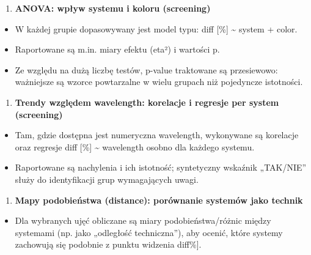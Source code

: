 \documentclass[
  10pt,
]{article}
\providecommand{\tightlist}{%
  \setlength{\itemsep}{0pt}\setlength{\parskip}{0pt}}
\begin{document}
\begin{enumerate}
\def\labelenumi{\arabic{enumi}.}
\setcounter{enumi}{4}
\tightlist
\item
  \textbf{ANOVA: wpływ systemu i koloru (screening)}
\end{enumerate}

\begin{itemize}
\tightlist
\item
  W każdej grupie dopasowywany jest model typu: \textbar diff\textbar{}
  {[}\%{]} \textasciitilde{} system + color.
\item
  Raportowane są m.in. miary efektu (eta²) i wartości p.
\item
  Ze względu na dużą liczbę testów, p-value traktowane są przesiewowo:
  ważniejsze są wzorce powtarzalne w wielu grupach niż pojedyncze
  istotności.
\end{itemize}

\begin{enumerate}
\def\labelenumi{\arabic{enumi}.}
\setcounter{enumi}{5}
\tightlist
\item
  \textbf{Trendy względem wavelength: korelacje i regresje per system
  (screening)}
\end{enumerate}

\begin{itemize}
\tightlist
\item
  Tam, gdzie dostępna jest numeryczna wavelength, wykonywane są
  korelacje oraz regresje \textbar diff\textbar{} {[}\%{]}
  \textasciitilde{} wavelength osobno dla każdego systemu.
\item
  Raportowane są nachylenia i ich istotność; syntetyczny wskaźnik
  „TAK/NIE'' służy do identyfikacji grup wymagających uwagi.
\end{itemize}

\begin{enumerate}
\def\labelenumi{\arabic{enumi}.}
\setcounter{enumi}{6}
\tightlist
\item
  \textbf{Mapy podobieństwa (distance): porównanie systemów jako
  technik}
\end{enumerate}

\begin{itemize}
\tightlist
\item
  Dla wybranych ujęć obliczane są miary podobieństwa/różnic między
  systemami (np. jako „odległość techniczna''), aby ocenić, które
  systemy zachowują się podobnie z punktu widzenia
  \textbar diff\textbar{[}\%{]}.
\end{itemize}
\end{document}
